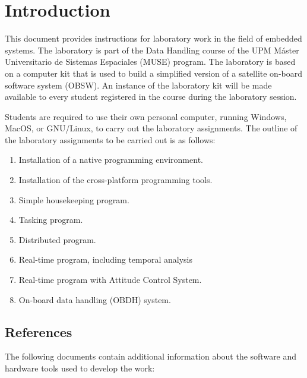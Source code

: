 \chapter*{Introduction}\label{ch:introduction}

This document provides instructions for laboratory work in the field of embedded systems. The laboratory is part of the Data Handling course of the UPM Máster Universitario de Sistemas Espaciales (MUSE) program.
The laboratory is based on a computer kit that is used to build a simplified version of a satellite on-board software system (OBSW). An instance of the laboratory kit will be made available to every student registered in the course during the laboratory session.

Students are required to use their own personal computer, running Windows, MacOS, or GNU/Linux, to carry out the laboratory assignments. 
The outline of the laboratory assignments to be carried out is as follows:
\begin{enumerate}
\item	Installation of a native programming environment.
\item	Installation of the cross-platform programming tools.
\item   Simple housekeeping program.
\item   Tasking program.
\item   Distributed program.
\item   Real-time program, including temporal analysis
\item	Real-time program with Attitude Control System.
\item   On-board data handling (OBDH) system.
\end{enumerate}

\section*{References}

The following documents contain additional information about the software
and hardware tools used to develop the work:

